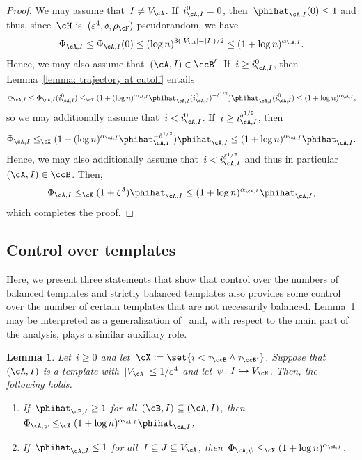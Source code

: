 \documentclass[11pt]{amsart}
\newcommand{\eps}{\varepsilon}
\DeclarePairedDelimiter{\abs}{\lvert}{\rvert}
\newcommand{\Xleq}{\leq_{\cX}}
\newcommand{\injection}{\hookrightarrow}
\newtheorem{lemma}[algocf]{Lemma}
\theoremstyle{definition}
\numberwithin{equation}{section}
\begin{document}
	\begin{proof}
		We may assume that~$I\neq V_\cA$.
		If~$i_{\cA,I}^0=0$, then~$\phihat_{\cA,I}(0)\leq 1$ and thus, since~$\cH$ is~$(\eps^4,\delta,\rho_\cF)$-pseudorandom, we have
		\begin{equation*}
			\Phi_{\cA,I}
			\leq\Phi_{\cA,I}(0)
			\leq (\log n)^{3(\abs{V_\cA}-\abs{I})/2}
			\leq (1+\log n)^{\alpha_{\cA,I}}.
		\end{equation*}
		Hence, we may also assume that~$(\cA,I)\in\ccB'$.
		If~$i\geq i_{\cA,I}^{0}$, then Lemma~\ref{lemma: trajectory at cutoff} entails
		\begin{equation*}
			\Phi_{\cA,I}
			\leq\Phi_{\cA,I}(i_{\cA,I}^{0})
			\Xleq (1+(\log n)^{\alpha_{\cA,I}}\phihat_{\cA,I}(i_{\cA,I}^0)^{-\delta^{1/2}})\phihat_{\cA,I}(i_{\cA,I}^0)
			\leq (1+\log n)^{\alpha_{\cA,I}},
		\end{equation*}
		so we may additionally assume that~$i< i_{\cA,I}^0$.
		If~$i\geq i_{\cA,I}^{\delta^{1/2}}$, then
		\begin{equation*}
			\Phi_{\cA,I}
			\Xleq (1+(\log n)^{\alpha_{\cA,I}}\phihat_{\cA,I}^{-\delta^{1/2}})\phihat_{\cA,I}
			\leq (1+\log n)^{\alpha_{\cA,I}}\phihat_{\cA,I}.
		\end{equation*}
		Hence, we may also additionally assume that~$i< i_{\cA,I}^{\delta^{1/2}}$ and thus in particular~$(\cA,I)\in\ccB$.
		Then,
		\begin{equation*}
			\Phi_{\cA,I}
			\Xleq (1+\zeta^\delta)\phihat_{\cA,I}
			\leq (1+\log n)^{\alpha_{\cA,I}}\phihat_{\cA,I},
		\end{equation*}
		which completes the proof.
	\end{proof}
	
	\subsection{Control over templates}
	Here, we present three statements that show that control over the numbers of balanced templates and strictly balanced templates also provides some control over the number of certain templates that are not necessarily balanced.
	Lemma~\ref{lemma: arbitrary embedding} may be interpreted as a generalization of~\cite[Corollary~3.3]{BFL:15} and, with respect to the main part of the analysis, plays a similar auxiliary role.
	
	\begin{lemma}\label{lemma: arbitrary embedding}
		Let~$i\geq 0$ and let~$\cX:=\set{i<\tau_\ccB\wedge\tau_{\ccB'}}$.
		Suppose that~$(\cA,I)$ is a template with~$\abs{V_\cA}\leq 1/\eps^4$ and let~$\psi\colon I\injection V_\cH$.
		Then, the following holds.
		\begin{enumerate}[label=\textup{(\roman*)}]
			\item\label{item: arbitrary non-vanishing embedding} If~$\phihat_{\cB,I}\geq 1$ for all~$(\cB,I)\subseteq (\cA,I)$, then~$\Phi_{\cA,\psi}\Xleq (1+\log n)^{\alpha_{\cA,I}}\phihat_{\cA,I}$;
			\item\label{item: arbitrary vanishing embedding} If~$\phihat_{\cA,J}\leq 1$ for all~$I\subseteq J\subseteq V_\cA$, then~$\Phi_{\cA,\psi}\Xleq (1+\log n)^{\alpha_{\cA,I}}$.
		\end{enumerate}
	\end{lemma}
	
\end{document}
